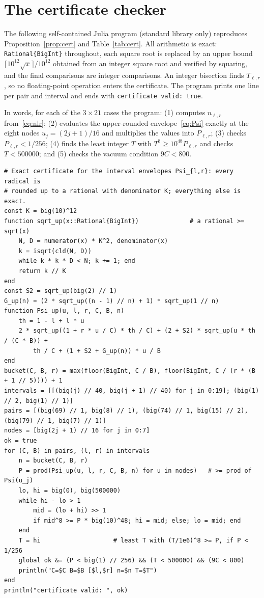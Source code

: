 \documentclass[11pt,a4paper]{article}
\theoremstyle{definition}
\theoremstyle{remark}
\newcommand{\1}{\mathbf 1}
\begin{document}
\appendix
\section{The certificate checker}\label{app:checker}
The following self-contained Julia program (standard library only)
reproduces Proposition~\ref{prop:cert} and Table~\ref{tab:cert}.
All arithmetic is exact: \texttt{Rational\{BigInt\}} throughout, each
square root is replaced by an upper bound $\lceil10^{12}\sqrt x\rceil/10^{12}$
obtained from an integer square root and verified by squaring, and the
final comparisons are integer comparisons. An integer bisection finds $T_{\ell,r}$, so no floating-point
operation enters the certificate. The program prints one line per pair and
interval and ends with \texttt{certificate valid: true}.

In words, for each of the $3\times21$ cases the program:
(1) computes $n_{\ell,r}$ from~\eqref{eq:nlr};
(2) evaluates the upper-rounded envelope~\eqref{eq:Psi} exactly at the
eight nodes $u_j=(2j+1)/16$ and multiplies the values into $P_{\ell,r}$;
(3) checks $P_{\ell,r}<1/256$;
(4) finds the least integer $T$ with $T^8\ge10^{48}P_{\ell,r}$ and checks
$T<500000$; and (5) checks the vacuum condition $9C<800$.

\begin{lstlisting}[language={}]
# Exact certificate for the interval envelopes Psi_{l,r}: every radical is
# rounded up to a rational with denominator K; everything else is exact.
const K = big(10)^12
function sqrt_up(x::Rational{BigInt})              # a rational >= sqrt(x)
    N, D = numerator(x) * K^2, denominator(x)
    k = isqrt(cld(N, D))
    while k * k * D < N; k += 1; end
    return k // K
end
const S2 = sqrt_up(big(2) // 1)
G_up(n) = (2 * sqrt_up((n - 1) // n) + 1) * sqrt_up(1 // n)
function Psi_up(u, l, r, C, B, n)
    th = 1 - l + l * u
    2 * sqrt_up((1 + r * u / C) * th / C) + (2 + S2) * sqrt_up(u * th / (C * B)) +
        th / C + (1 + S2 + G_up(n)) * u / B
end
bucket(C, B, r) = max(floor(BigInt, C / B), floor(BigInt, C / (r * (B + 1 // 5)))) + 1
intervals = [[(big(j) // 40, big(j + 1) // 40) for j in 0:19]; (big(1) // 2, big(1) // 1)]
pairs = [(big(69) // 1, big(8) // 1), (big(74) // 1, big(15) // 2), (big(79) // 1, big(7) // 1)]
nodes = [big(2j + 1) // 16 for j in 0:7]
ok = true
for (C, B) in pairs, (l, r) in intervals
    n = bucket(C, B, r)
    P = prod(Psi_up(u, l, r, C, B, n) for u in nodes)   # >= prod of Psi(u_j)
    lo, hi = big(0), big(500000)
    while hi - lo > 1
        mid = (lo + hi) >> 1
        if mid^8 >= P * big(10)^48; hi = mid; else; lo = mid; end
    end
    T = hi                    # least T with (T/1e6)^8 >= P, if P < 1/256
    global ok &= (P < big(1) // 256) && (T < 500000) && (9C < 800)
    println("C=$C B=$B [$l,$r] n=$n T=$T")
end
println("certificate valid: ", ok)
\end{lstlisting}
\end{document}
